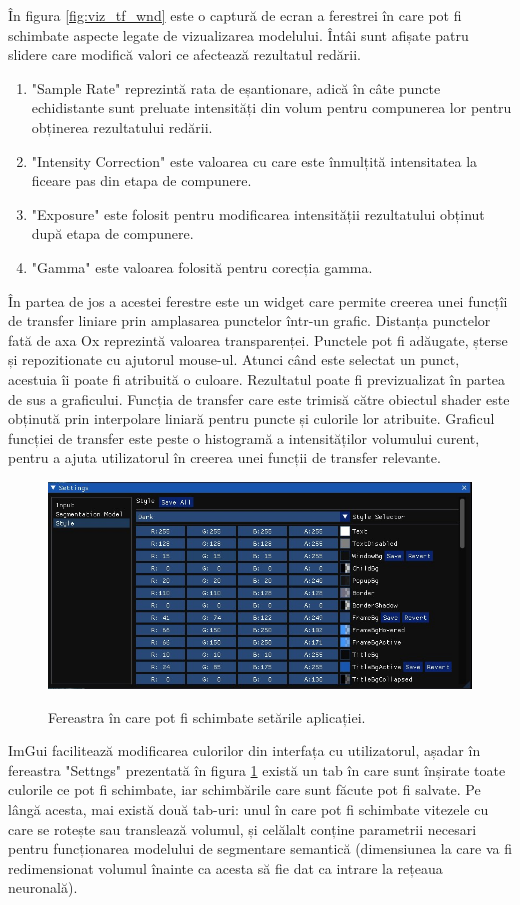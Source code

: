 În figura \ref{fig:viz_tf_wnd} este o captură de ecran a ferestrei în care pot fi schimbate aspecte legate de vizualizarea modelului. Întâi sunt afișate patru slidere care modifică valori ce afectează rezultatul redării.

\begin{enumerate}
    \item "Sample Rate" reprezintă rata de eșantionare, adică în câte puncte echidistante sunt preluate intensități din volum pentru compunerea lor pentru obținerea rezultatului redării.
    \item "Intensity Correction" este valoarea cu care este înmulțită intensitatea la ficeare pas din etapa de compunere.
    \item "Exposure" este folosit pentru modificarea intensității rezultatului obținut după etapa de compunere.
    \item "Gamma" este valoarea folosită pentru corecția gamma.
\end{enumerate}

În partea de jos a acestei ferestre este un widget care permite creerea unei funcțîi de transfer liniare prin amplasarea punctelor într-un grafic. Distanța punctelor fată de axa Ox reprezintă valoarea transparenței. Punctele pot fi adăugate, șterse și repozitionate cu ajutorul mouse-ul. Atunci când este selectat un punct, acestuia îi poate fi atribuită o culoare. Rezultatul poate fi previzualizat în partea de sus a graficului. Funcția de transfer care este trimisă către obiectul shader este obținută prin interpolare liniară pentru puncte și culorile lor atribuite. Graficul funcției de transfer este peste o histogramă a intensităților volumului curent, pentru a ajuta utilizatorul în creerea unei funcții de transfer relevante.

\begin{figure}[!h]
    \centering
    \includegraphics[width=12cm]{images/wnd_settings.jpg}
    \\
    \caption{Fereastra în care pot fi schimbate setările aplicației.}
    \label{fig:viz_settings_wnd}
\end{figure}

ImGui facilitează modificarea culorilor din interfața cu utilizatorul, așadar în fereastra "Settngs" prezentată în figura \ref{fig:viz_settings_wnd} există un tab în care sunt înșirate toate culorile ce pot fi schimbate, iar schimbările care sunt făcute pot fi salvate. Pe lângă acesta, mai există două tab-uri: unul în care pot fi schimbate vitezele cu care se rotește sau translează volumul, și celălalt conține parametrii necesari pentru funcționarea modelului de segmentare semantică (dimensiunea la care va fi redimensionat volumul înainte ca acesta să fie dat ca intrare la rețeaua neuronală).
